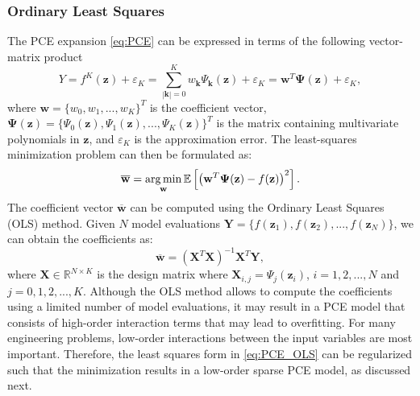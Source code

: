 \subsubsection{Ordinary Least Squares}
The PCE expansion \eqref{eq:PCE} can be expressed in terms of the following vector-matrix product
\begin{equation}\label{eq:LSM}
Y = f^{K}(\mathbf{z}) +\varepsilon_K = \sum_{|\mathbf{k}| = 0}^K w_{\mathbf{k}}\Psi_{\mathbf{k}}(\mathbf{z}) + \varepsilon_K = \mathbf{w}^T\boldsymbol{\Psi}(\mathbf{z}) +\varepsilon_K,
\end{equation} 
where $\mathbf{w} = \{w_0,w_1,...,w_K\}^T$ is the coefficient vector, $\boldsymbol{\Psi}(\mathbf{z}) = \{\Psi_0(\mathbf{z}), \Psi_1(\mathbf{z}), ..., \Psi_K(\mathbf{z})\}^T$ is the matrix containing multivariate polynomials in $\mathbf{z}$, and $\varepsilon_K$ is the approximation error. The least-squares minimization problem can then be formulated as:
\begin{equation}\label{eq:PCE_OLS}
\mathbf{\overline{w}} = \operatorname*{arg\,min}_{\mathbf{w}} \mathbb{E}\left[\left(\mathbf{w}^T \boldsymbol{\Psi}(\mathbf{z}) - f(\mathbf{z})\right)^2\right].
 \end{equation}
The coefficient vector $\mathbf{\overline{w}}$ can be computed using the Ordinary Least Squares (OLS) method. Given $N$ model evaluations $\mathbf{Y} = \{f(\mathbf{z}_1), f(\mathbf{z}_2), ..., f(\mathbf{z}_N)\}$, we can obtain the coefficients as:
\begin{equation}\label{eq:OLS}
\overline{\mathbf{w}} = (\mathbf{X}^T\mathbf{X})^{-1}\mathbf{X}^T\mathbf{Y},
\end{equation}
where $\mathbf{X}\in \mathbb{R}^{N\times K}$ is the design matrix where $\mathbf{X}_{i,j} = \Psi_{j}(\mathbf{z}_i)$, $i = 1,2, ..., N$ and $j = 0,1,2,..., K$. Although the OLS method allows to compute the coefficients using a limited number of model evaluations, it may result in a PCE model that consists of high-order interaction terms that may lead to overfitting. For many engineering problems, low-order interactions between the input variables are most important. Therefore, the least squares form in \eqref{eq:PCE_OLS} can be regularized such that the minimization results in a low-order sparse PCE model, as discussed next.


